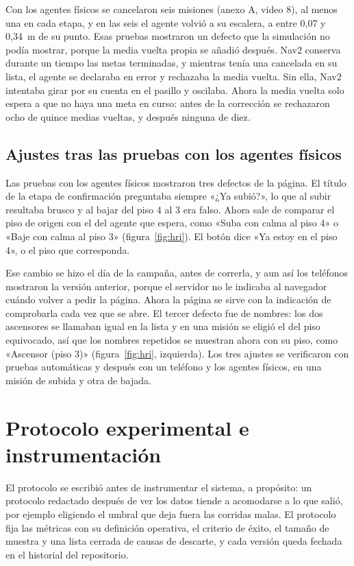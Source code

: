 Con los agentes físicos se cancelaron seis misiones (anexo A, video 8), al menos una
en cada etapa, y en
las seis el agente volvió a su escalera, a entre 0,07 y 0,34~m de su punto. Esas
pruebas mostraron un defecto que la simulación no podía mostrar, porque la media
vuelta propia se añadió después. Nav2 conserva durante un tiempo las metas terminadas, y mientras tenía una cancelada en su lista, el agente se declaraba en error y rechazaba la media vuelta. Sin ella, Nav2 intentaba girar
por su cuenta en el pasillo y oscilaba. Ahora la media vuelta solo espera a que no
haya una meta en curso: antes de la corrección se rechazaron ocho de quince
medias vueltas, y después ninguna de diez.

\subsection{Ajustes tras las pruebas con los agentes físicos}
\label{sec:ajustes-campo}

Las pruebas con los agentes físicos mostraron tres defectos de la página. El título de
la etapa de confirmación preguntaba siempre «¿Ya subió?», lo que al subir
resultaba brusco y al bajar del piso 4 al 3 era falso. Ahora sale de comparar el
piso de origen con el del agente que espera, como «Suba con calma al piso 4» o «Baje con calma al piso 3» (figura~\ref{fig:hri}). El botón dice «Ya estoy en el piso 4», o el piso que
corresponda.

Ese cambio se hizo el día de la campaña, antes de correrla, y aun así los
teléfonos mostraron la versión anterior, porque el servidor no le indicaba al
navegador cuándo volver a pedir la página. Ahora la página se sirve con la
indicación de comprobarla cada vez que se abre. El tercer defecto fue de nombres:
los dos ascensores se llamaban igual en la lista y en una misión se eligió el del
piso equivocado, así que los nombres repetidos se muestran ahora con su piso, como
«Ascensor (piso 3)» (figura~\ref{fig:hri}, izquierda). Los tres ajustes se verificaron con pruebas automáticas y
después con un teléfono y los agentes físicos, en una misión de subida y otra de
bajada.

\section{Protocolo experimental e instrumentación}
\label{sec:protocolo}

El protocolo se escribió antes de instrumentar el sistema, a propósito: un protocolo redactado después
de ver los datos tiende a acomodarse a lo que salió, por ejemplo eligiendo el
umbral que deja fuera las corridas malas. El protocolo fija las métricas con su
definición operativa, el criterio de éxito, el tamaño de muestra y una lista
cerrada de causas de descarte, y cada versión queda fechada en el historial del
repositorio.

